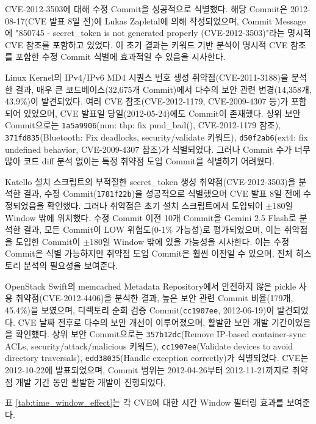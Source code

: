 ﻿\documentclass[conference]{IEEEtran}
\begin{document}
CVE-2012-3503에 대해 수정 Commit을 성공적으로 식별했다. 해당 Commit은 2012-08-17(CVE 발표 8일 전)에 Lukas Zapletal에 의해 작성되었으며, Commit Message에 "850745 - secret\_token is not generated properly (CVE-2012-3503)"라는 명시적 CVE 참조를 포함하고 있었다. 이 초기 결과는 키워드 기반 분석이 명시적 CVE 참조를 포함한 수정 Commit 식별에 효과적일 수 있음을 시사한다.

Linux Kernel의 IPv4/IPv6 MD4 시퀀스 번호 생성 취약점(CVE-2011-3188)을 분석한 결과, 매우 큰 코드베이스(32,675개 Commit)에서 다수의 보안 관련 변경(14,358개, 43.9\%)이 발견되었다. 여러 CVE 참조(CVE-2012-1179, CVE-2009-4307 등)가 포함되어 있었으며, CVE 발표일 당일(2012-05-24)에도 Commit이 존재했다. 상위 보안 Commit으로는 \texttt{1a5a9906}(mm: thp: fix pmd\_bad(), CVE-2012-1179 참조), \texttt{371fd835}(Bluetooth: Fix deadlocks, security/validate 키워드), \texttt{d50f2ab6}(ext4: fix undefined behavior, CVE-2009-4307 참조)가 식별되었다. 그러나 Commit 수가 너무 많아 코드 diff 분석 없이는 특정 취약점 도입 Commit을 식별하기 어려웠다.

Katello 설치 스크립트의 부적절한 secret\_token 생성 취약점(CVE-2012-3503)을 분석한 결과, 수정 Commit(\texttt{1781f22b})을 성공적으로 식별했으며 CVE 발표 8일 전에 수정되었음을 확인했다. 그러나 취약점은 초기 설치 스크립트에서 도입되어 $\pm$180일 Window 밖에 위치했다. 수정 Commit 이전 10개 Commit을 Gemini 2.5 Flash로 분석한 결과, 모든 Commit이 LOW 위험도(0-1\% 가능성)로 평가되었으며, 이는 취약점을 도입한 Commit이 $\pm$180일 Window 밖에 있을 가능성을 시사한다. 이는 수정 Commit은 식별 가능하지만 취약점 도입 Commit은 훨씬 이전일 수 있으며, 전체 히스토리 분석의 필요성을 보여준다.

OpenStack Swift의 memcached Metadata Repository에서 안전하지 않은 pickle 사용 취약점(CVE-2012-4406)을 분석한 결과, 높은 보안 관련 Commit 비율(179개, 45.4\%)을 보였으며, 디렉토리 순회 검증 Commit(\texttt{cc1907ee}, 2012-06-19)이 발견되었다. CVE 날짜 전후로 다수의 보안 개선이 이루어졌으며, 활발한 보안 개발 기간이었음을 확인했다. 상위 보안 Commit으로는 \texttt{357b12dc}(Remove IP-based container-sync ACLs, security/attack/malicious 키워드), \texttt{cc1907ee}(Validate devices to avoid directory traversals), \texttt{edd38035}(Handle exception correctly)가 식별되었다. CVE는 2012-10-22에 발표되었으며, Commit 범위는 2012-04-26부터 2012-11-21까지로 취약점 개발 기간 동안 활발한 개발이 진행되었다.

표 \ref{tab:time_window_effect}는 각 CVE에 대한 시간 Window 필터링 효과를 보여준다.
\end{document}
